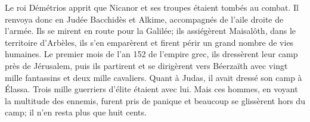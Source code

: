 Le roi Démétrios apprit que Nicanor et ses troupes étaient tombés au combat.
	Il renvoya donc en Judée Bacchidès et Alkime,
	accompagnés de l’aile droite de l’armée.
Ils se mirent en route pour la Galilée;
	ils assiégèrent Maisalôth, dans le territoire d’Arbèles,
	ils s’en emparèrent et firent périr un grand nombre de vies humaines.
Le premier mois de l’an 152 de l’empire grec,
	ils dressèrent leur camp près de Jérusalem,
	puis ils partirent et se dirigèrent vers Béerzaïth
	avec vingt mille fantassins et deux mille cavaliers.
Quant à Judas, il avait dressé son camp à Élassa.
	Trois mille guerriers d’élite étaient avec lui.
Mais ces hommes, en voyant la multitude des ennemis, furent pris de panique
	et beaucoup se glissèrent hors du camp; il n’en resta plus que huit cents.
